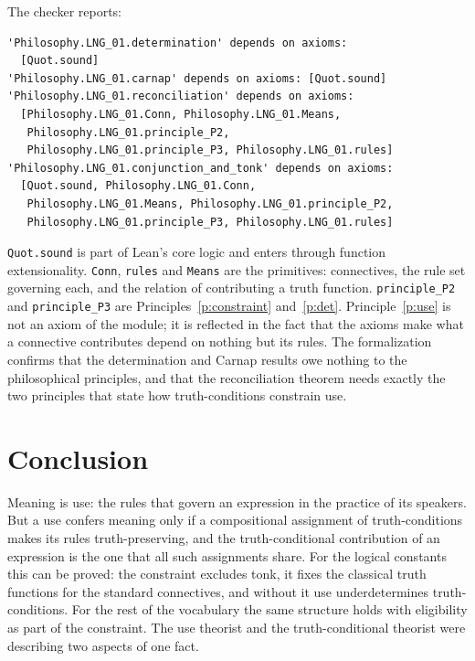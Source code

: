 \documentclass{situationist-preprint}
\begin{document}
The checker reports:

\begin{lstlisting}
'Philosophy.LNG_01.determination' depends on axioms:
  [Quot.sound]
'Philosophy.LNG_01.carnap' depends on axioms: [Quot.sound]
'Philosophy.LNG_01.reconciliation' depends on axioms:
  [Philosophy.LNG_01.Conn, Philosophy.LNG_01.Means,
   Philosophy.LNG_01.principle_P2,
   Philosophy.LNG_01.principle_P3, Philosophy.LNG_01.rules]
'Philosophy.LNG_01.conjunction_and_tonk' depends on axioms:
  [Quot.sound, Philosophy.LNG_01.Conn,
   Philosophy.LNG_01.Means, Philosophy.LNG_01.principle_P2,
   Philosophy.LNG_01.principle_P3, Philosophy.LNG_01.rules]
\end{lstlisting}

\texttt{Quot.sound} is part of Lean's core logic and enters through function extensionality. \texttt{Conn}, \texttt{rules} and \texttt{Means} are the primitives: connectives, the rule set governing each, and the relation of contributing a truth function. \texttt{principle\_P2} and \texttt{principle\_P3} are Principles~\ref{p:constraint} and~\ref{p:det}. Principle~\ref{p:use} is not an axiom of the module; it is reflected in the fact that the axioms make what a connective contributes depend on nothing but its rules. The formalization confirms that the determination and Carnap results owe nothing to the philosophical principles, and that the reconciliation theorem needs exactly the two principles that state how truth-conditions constrain use.

\section{Conclusion}

Meaning is use: the rules that govern an expression in the practice of its speakers. But a use confers meaning only if a compositional assignment of truth-conditions makes its rules truth-preserving, and the truth-conditional contribution of an expression is the one that all such assignments share. For the logical constants this can be proved: the constraint excludes tonk, it fixes the classical truth functions for the standard connectives, and without it use underdetermines truth-conditions. For the rest of the vocabulary the same structure holds with eligibility as part of the constraint. The use theorist and the truth-conditional theorist were describing two aspects of one fact.
\end{document}
